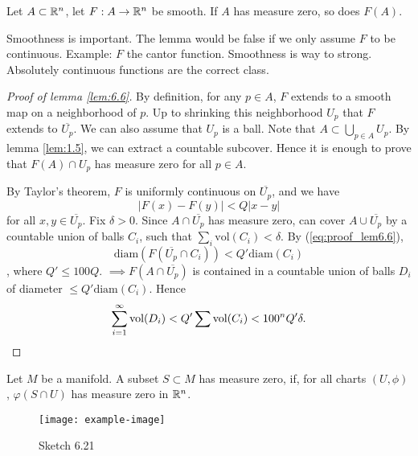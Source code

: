 \begin{lemma}\label{lem:6.6}
    Let \(A\subset\mathbb{R}^n\), let \(F:A\to\mathbb{R}^n\) be smooth. If \(A\) has measure zero, so does \(F(A)\).
\end{lemma}

\begin{remark}
    Smoothness is important. The lemma would be false if we only assume \(F\) to be continuous. Example: 
    \(F\) the cantor function. Smoothness is way to strong. Absolutely continuous functions are the correct class.
\end{remark}

\begin{proof}[Proof of lemma \ref{lem:6.6}]
    By definition, for any \(p\in A\), \(F\) extends to a smooth map on a neighborhood of \(p\). Up 
    to shrinking this neighborhood \(U_p\) that \(F\) extends to \(\overline{U_p}\). We can also assume that 
    \(U_p\) is a ball. Note that \(A\subset \bigcup_{p\in A} U_p\). By lemma \ref{lem:1.5}, we can extract 
    a countable subcover. Hence it is enough to prove that \(F(A)\cap U_p\) has measure zero for 
    all \(p\in A\). 

    By Taylor's theorem, \(F\) is uniformly continuous on \(\overline{U_p}\),
    and we have 
    \begin{equation}\label{eq:proof_lem6.6}
        |F(x)-F(y)|< Q|x-y|  
    \end{equation}
    for all \(x,y\in\overline{U_p}\). Fix \(\delta>0\). Since \(A\cap \overline{U_p}\) has measure zero, 
    can cover \(A\cup \overline{U_p}\) by a countable union of balls \(C_i\), such that  
    \(\sum_{i}\text{vol}(C_i)<\delta.\) By (\ref{eq:proof_lem6.6}), \[\text{diam}(F(\overline{U_p}\cap C_i))<Q'\text{diam}(C_i)\],
    where \(Q'\leq 100Q\). \(\implies F(A\cap \overline{U_p})\) is contained in a countable union of balls \(D_i\)
    of diameter \(\leq Q'\text{diam}(C_i)\). Hence 
    \[\sum_{i=1}^\infty\text{vol}(D_i)<Q'\sum\text{vol}(C_i)<100^n Q'\delta.\qedhere\]

\end{proof}

\begin{definition*}
    Let \(M\) be a manifold. A subset \(S\subset M\) has measure zero, if, for all charts \((U,\phi)\),
    \(\varphi(S\cap U)\) has measure zero in \(\mathbb{R}^n\).
    \begin{figure}[H]\label{fig:6.21}
        \centering
        \texttt{[image: example-image]}
        \caption{Sketch 6.21}
    \end{figure}
\end{definition*}

